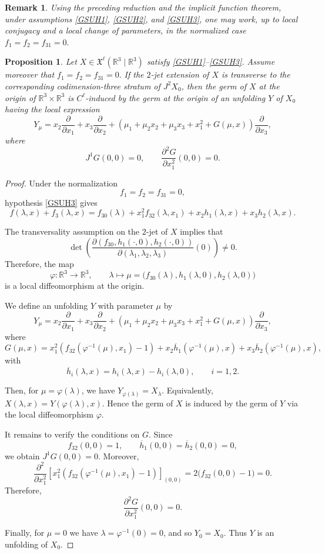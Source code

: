 \documentclass[12pt]{article}
\newtheorem{proposition}{Proposition}[section]
\newtheorem{remark}{Remark}[section]
\newtheorem{remark definition}{Remark Definition}[section]
\begin{document}
\begin{remark}
	Using the preceding reduction and the implicit function theorem, under
	assumptions \eqref{GSUH1}, \eqref{GSUH2}, and \eqref{GSUH3}, one may work,
	up to local conjugacy and a local change of parameters, in the normalized
	case $f_1=f_2=f_{31}=0.$
\end{remark}
\begin{proposition}
	Let $X\in \mathfrak{X}^{\ell}(\mathbb{R}^3\mid \mathbb{R}^3)$
	satisfy \eqref{GSUH1}--\eqref{GSUH3}. Assume moreover that
	$f_1=f_2=f_{31}=0.$
	If the $2$-jet extension of $X$ is transverse to the corresponding
	codimension-three stratum of $J^2X_0$, then the germ of $X$ at the origin of
	$\mathbb{R}^3\times \mathbb{R}^3$ is $C^\ell$-induced by the germ at the
	origin of an unfolding $Y$ of $X_0$ having the local expression
	$$
	Y_\mu
	=
	x_2\frac{\partial}{\partial x_1}
	+
	x_3\frac{\partial}{\partial x_2}
	+
	\left(
	\mu_1+\mu_2x_2+\mu_3x_3+x_1^2+G(\mu,x)
	\right)
	\frac{\partial}{\partial x_3},
	$$
	where
	$$
	J^1G(0,0)=0,
	\qquad
	\frac{\partial^2G}{\partial x_1^2}(0,0)=0.
	$$
\end{proposition}
\begin{proof}
	Under the normalization
	$$
	f_1=f_2=f_{31}=0,
	$$
	hypothesis \eqref{GSUH3} gives
	$$
	f(\lambda,x)+f_3(\lambda,x)
	=
	f_{30}(\lambda)
	+
	x_1^2f_{32}(\lambda,x_1)
	+
	x_2h_1(\lambda,x)
	+
	x_3h_2(\lambda,x).
	$$
	
	The transversality assumption on the $2$-jet of $X$ implies that
	$$
	\det
	\left(
	\frac{\partial(f_{30},h_1(\cdot,0),h_2(\cdot,0))}
	{\partial(\lambda_1,\lambda_2,\lambda_3)}(0)
	\right)
	\neq 0.
	$$
	Therefore, the map
	$$
	\varphi:\mathbb{R}^3\longrightarrow \mathbb{R}^3,
	\qquad
	\lambda\longmapsto \mu
	=
	\bigl(
	f_{30}(\lambda),
	h_1(\lambda,0),
	h_2(\lambda,0)
	\bigr)
	$$
	is a local diffeomorphism at the origin.
	
	We define an unfolding $Y$ with parameter $\mu$ by
	$$
	Y_\mu
	=
	x_2\frac{\partial}{\partial x_1}
	+
	x_3\frac{\partial}{\partial x_2}
	+
	\left(
	\mu_1+\mu_2x_2+\mu_3x_3+x_1^2+G(\mu,x)
	\right)
	\frac{\partial}{\partial x_3},
	$$
	where
	$$
	G(\mu,x)
	=
	x_1^2
	\left(
	f_{32}(\varphi^{-1}(\mu),x_1)-1
	\right)
	+
	x_2\overline{h}_1(\varphi^{-1}(\mu),x)
	+
	x_3\overline{h}_2(\varphi^{-1}(\mu),x),
	$$
	with
	$$
	\overline{h}_i(\lambda,x)
	=
	h_i(\lambda,x)-h_i(\lambda,0),
	\qquad i=1,2.
	$$
	
	Then, for $\mu=\varphi(\lambda)$, we have $Y_{\varphi(\lambda)}=	X_\lambda.$
	Equivalently, $
	X(\lambda,x)=Y(\varphi(\lambda),x).$
	Hence the germ of $X$ is induced by the germ of $Y$ via the local
	diffeomorphism $\varphi$.
	
	It remains to verify the conditions on $G$. Since
	$$
	f_{32}(0,0)=1,
	\qquad
	\overline{h}_1(0,0)=\overline{h}_2(0,0)=0,
	$$
	we obtain $J^1G(0,0)=0.$ Moreover,
	$$
	\frac{\partial^2}{\partial x_1^2}
	\left[
	x_1^2
	\left(
	f_{32}(\varphi^{-1}(\mu),x_1)-1
	\right)
	\right]_{(0,0)}
	=
	2\bigl(f_{32}(0,0)-1\bigr)
	=
	0.
	$$
	Therefore,
	$$
	\frac{\partial^2G}{\partial x_1^2}(0,0)=0.
	$$
	
	Finally, for $\mu=0$ we have $\lambda=\varphi^{-1}(0)=0$, and so $Y_0=X_0.$
	Thus $Y$ is an unfolding of $X_0$.
\end{proof}
\end{document}
